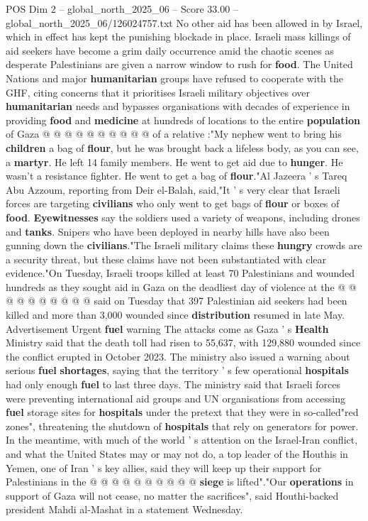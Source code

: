 \begin{textsample}{POS Dim 2 – global\_north\_2025\_06 – Score 33.00 – global\_north\_2025\_06/126024757.txt}
No other aid has been allowed in by Israel, which in effect has kept the punishing blockade in place.
Israeli mass killings of aid seekers have become a grim daily occurrence amid the chaotic scenes as desperate Palestinians are given a narrow window to rush for \textbf{food}.
The United Nations and major \textbf{humanitarian} groups have refused to cooperate with the GHF, citing concerns that it prioritises Israeli military objectives over \textbf{humanitarian} needs and bypasses organisations with decades of experience in providing \textbf{food} and \textbf{medicine} at hundreds of locations to the entire \textbf{population} of Gaza @ @ @ @ @ @ @ @ @ @ of a relative :"My nephew went to bring his \textbf{children} a bag of \textbf{flour}, but he was brought back a lifeless body, as you can see, a \textbf{martyr}.
He left 14 family members.
He went to get aid due to \textbf{hunger}.
He wasn't a resistance fighter.
He went to get a bag of \textbf{flour}."Al Jazeera ' s Tareq Abu Azzoum, reporting from Deir el-Balah, said,"It ' s very clear that Israeli forces are targeting \textbf{civilians} who only went to get bags of \textbf{flour} or boxes of \textbf{food}. \textbf{Eyewitnesses} say the soldiers used a variety of weapons, including drones and \textbf{tanks}.
Snipers who have been deployed in nearby hills have also been gunning down the \textbf{civilians}."The Israeli military claims these \textbf{hungry} crowds are a security threat, but these claims have not been substantiated with clear evidence."On Tuesday, Israeli troops killed at least 70 Palestinians and wounded hundreds as they sought aid in Gaza on the deadliest day of violence at the @ @ @ @ @ @ @ @ @ @ said on Tuesday that 397 Palestinian aid seekers had been killed and more than 3,000 wounded since \textbf{distribution} resumed in late May.
Advertisement Urgent \textbf{fuel} warning The attacks come as Gaza ' s \textbf{Health} Ministry said that the death toll had risen to 55,637, with 129,880 wounded since the conflict erupted in October 2023.
The ministry also issued a warning about serious \textbf{fuel} \textbf{shortages}, saying that the territory ' s few operational \textbf{hospitals} had only enough \textbf{fuel} to last three days.
The ministry said that Israeli forces were preventing international aid groups and UN organisations from accessing \textbf{fuel} storage sites for \textbf{hospitals} under the pretext that they were in so-called"red zones", threatening the shutdown of \textbf{hospitals} that rely on generators for power.
In the meantime, with much of the world ' s attention on the Israel-Iran conflict, and what the United States may or may not do, a top leader of the Houthis in Yemen, one of Iran ' s key allies, said they will keep up their support for Palestinians in the @ @ @ @ @ @ @ @ @ @ \textbf{siege} is lifted"."Our \textbf{operations} in support of Gaza will not cease, no matter the sacrifices", said Houthi-backed president Mahdi al-Mashat in a statement Wednesday.


\end{textsample}
